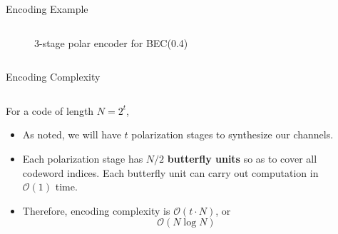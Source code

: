 \documentclass[8pt, compress]{beamer}
\begin{document}
\begin{frame}{Encoding Example}
\begin{columns}
\begin{column}{0.7\linewidth}
\begin{figure}
\begin{tikzpicture}[channel/.style={rectangle, draw=black!80, fill=white!5, very thick, minimum size=20}, scale=0.5, every node/.style={scale=0.8}]
        \end{tikzpicture}
        
        \caption{3-stage polar encoder for BEC(0.4)}
        
        \end{figure}
    \end{column}
\end{columns}    
\end{frame}




\begin{frame}{Encoding Complexity}
    \begin{columns}
    \begin{column}{0.6\linewidth}
    For a code of length $N = 2^t$,
    \begin{itemize}
        \item<1-> As noted, we will have $t$ polarization stages to synthesize our channels.
        \item<2-> Each polarization stage has $N/2$ \textbf{butterfly units} so as to cover all codeword indices. Each butterfly unit can carry out computation in $\mathcal{O}(1)$ time.
        \item<3-> Therefore, encoding complexity is $\mathcal{O}(t\cdot N)$, or $$\mathcal{O}(N \log N)$$
        
    \end{itemize}
    \end{column}
    \begin{column}{0.4\linewidth}
    
    \end{column}
    \end{columns}
    
\end{frame}
\end{document}

